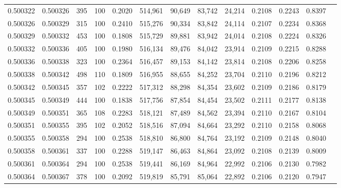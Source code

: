 \begin{tabular}{rrrrrrrrrrrrr}
0.500322 & 0.500326 &   395 & 100 &                                     0.2020 & 514,961 &  90,649 &  83,742 &  24,214 & 0.2108 & 0.2243 & 0.8397 \\
0.500326 & 0.500329 &   315 & 100 &                                     0.2410 & 515,276 &  90,334 &  83,842 &  24,114 & 0.2107 & 0.2234 & 0.8368 \\
0.500329 & 0.500332 &   453 & 100 &                                     0.1808 & 515,729 &  89,881 &  83,942 &  24,014 & 0.2108 & 0.2224 & 0.8326 \\
0.500332 & 0.500336 &   405 & 100 &                                     0.1980 & 516,134 &  89,476 &  84,042 &  23,914 & 0.2109 & 0.2215 & 0.8288 \\
0.500336 & 0.500338 &   323 & 100 &                                     0.2364 & 516,457 &  89,153 &  84,142 &  23,814 & 0.2108 & 0.2206 & 0.8258 \\
0.500338 & 0.500342 &   498 & 110 &                                     0.1809 & 516,955 &  88,655 &  84,252 &  23,704 & 0.2110 & 0.2196 & 0.8212 \\
0.500342 & 0.500345 &   357 & 102 &                                     0.2222 & 517,312 &  88,298 &  84,354 &  23,602 & 0.2109 & 0.2186 & 0.8179 \\
0.500345 & 0.500349 &   444 & 100 &                                     0.1838 & 517,756 &  87,854 &  84,454 &  23,502 & 0.2111 & 0.2177 & 0.8138 \\
0.500349 & 0.500351 &   365 & 108 &                                     0.2283 & 518,121 &  87,489 &  84,562 &  23,394 & 0.2110 & 0.2167 & 0.8104 \\
0.500351 & 0.500355 &   395 & 102 &                                     0.2052 & 518,516 &  87,094 &  84,664 &  23,292 & 0.2110 & 0.2158 & 0.8068 \\
0.500355 & 0.500358 &   294 & 100 &                                     0.2538 & 518,810 &  86,800 &  84,764 &  23,192 & 0.2109 & 0.2148 & 0.8040 \\
0.500358 & 0.500361 &   337 & 100 &                                     0.2288 & 519,147 &  86,463 &  84,864 &  23,092 & 0.2108 & 0.2139 & 0.8009 \\
0.500361 & 0.500364 &   294 & 100 &                                     0.2538 & 519,441 &  86,169 &  84,964 &  22,992 & 0.2106 & 0.2130 & 0.7982 \\
0.500364 & 0.500367 &   378 & 100 &                                     0.2092 & 519,819 &  85,791 &  85,064 &  22,892 & 0.2106 & 0.2120 & 0.7947 \\

\end{tabular}
